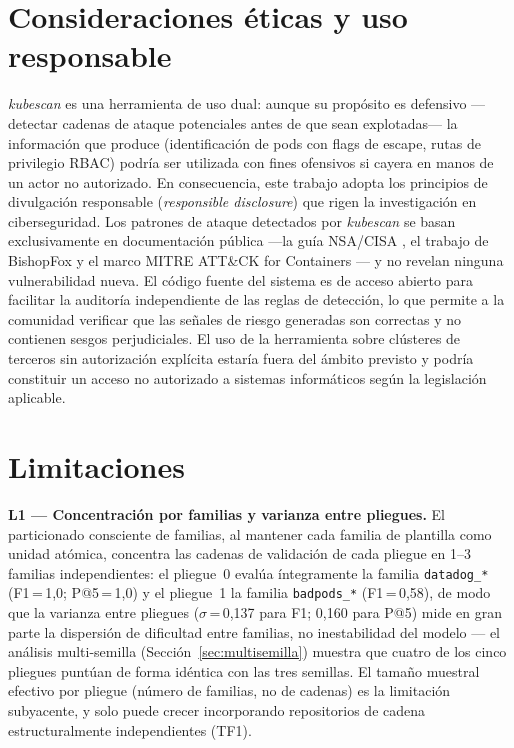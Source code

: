 \section{Consideraciones éticas y uso responsable}
\label{sec:etica}

\textit{kubescan} es una herramienta de uso dual: aunque su propósito es defensivo
—detectar cadenas de ataque potenciales antes de que sean explotadas— la información
que produce (identificación de pods con flags de escape, rutas de privilegio \ac{RBAC})
podría ser utilizada con fines ofensivos si cayera en manos de un actor no autorizado.
En consecuencia, este trabajo adopta los principios de divulgación responsable
(\textit{responsible disclosure}) que rigen la investigación en ciberseguridad.
Los patrones de ataque detectados por \textit{kubescan} se basan exclusivamente en
documentación pública —la guía \ac{NSA}/\ac{CISA} \citep{NSA2022}, el trabajo de BishopFox
\citep{BishopFox2021} y el marco MITRE ATT\&CK for Containers \citep{MITRE2021Containers}—
y no revelan ninguna vulnerabilidad nueva. El código fuente del sistema es de acceso
abierto para facilitar la auditoría independiente de las reglas de detección, lo que
permite a la comunidad verificar que las señales de riesgo generadas son correctas y
no contienen sesgos perjudiciales. El uso de la herramienta sobre clústeres de terceros
sin autorización explícita estaría fuera del ámbito previsto y podría constituir un
acceso no autorizado a sistemas informáticos según la legislación aplicable.

\section{Limitaciones}
\label{sec:limitaciones}

\textbf{L1 — Concentración por familias y varianza entre pliegues.} El
particionado consciente de familias, al mantener cada familia de plantilla como
unidad atómica, concentra las cadenas de validación de cada pliegue en 1--3
familias independientes: el pliegue~0 evalúa íntegramente la familia
\texttt{datadog\_*} (F1\,=\,1,0; P@5\,=\,1,0) y el pliegue~1 la familia
\texttt{badpods\_*} (F1\,=\,0,58), de modo que la varianza entre pliegues
(\(\sigma\)\,=\,0,137 para F1; 0,160 para P@5) mide en gran parte la dispersión
de dificultad entre familias, no inestabilidad del modelo — el análisis
multi-semilla (Sección~\ref{sec:multisemilla}) muestra que cuatro de los cinco
pliegues puntúan de forma idéntica con las tres semillas. El tamaño muestral
efectivo por pliegue (número de familias, no de cadenas) es la limitación
subyacente, y solo puede crecer incorporando repositorios de cadena
estructuralmente independientes (TF1).

